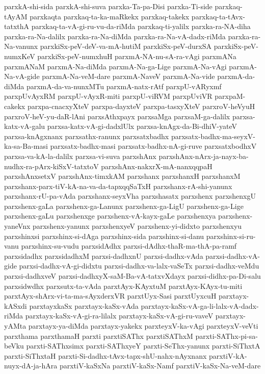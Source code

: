 {parxkA-shi-sida
parxkA-shi-suva
parxka-Ta-pa-Disi
parxka-Ti-side
parxkaq-tAyAM
parxkaqta
parxkaq-ta-ka-maRkekx
parxkaq-takekx
parxkaq-ta-tAvx-tatxthA
parxkaq-ta-vA-gi-ru-vu-da-riMda
parxkaq-ti-yalilx
parxka-ra-NA-diha
parxka-ra-Na-dalilx
parxka-ra-Na-diMda
parxka-ra-Na-vA-dadx-riMda
parxka-ra-Na-vanunx
parxkiSx-peV-deV-va-mA-hutiM
parxkiSx-peV-durxSA
parxkiSx-peV-numxKeV
parxkiSx-peV-numxhuH
parxmA-NA-nu-sA-ra-vAgi
parxmANa
parxmANaM
parxmA-Na-diMda
parxmA-Na-ga-Lige
parxmA-Na-vAgi
parxmA-Na-vA-gide
parxmA-Na-veM-dare
parxmA-NaveV
parxmA-Na-vide
parxmA-da-diMda
parxmA-da-va-nunxMTu
parxmA-natx-rAtf
parxpU-vARyxmf
parxpUvAyxRM
parxpU-vAyxR-miti
parxpU-viRVM
parxpUviVR
parxpaM-cakekx
parxpa-cnacxyXteV
parxpa-dayxteV
parxpa-tasxyXteV
parxroV-heVyuH
parxroV-heV-yu-daR-lAni
parxsAthxpayx
parxsaMga
parxsaM-ga-dalilx
parxsa-katx-vA-galu
parxsa-katx-vA-gi-dadxlUlx
parxsa-knAgx-da-Bi-dhiV-yateV
parxsa-knAgxnanx
parxsathx-ranunx
parxsatxbadhx
parxsatx-badhx-ma-seyxV-ka-sa-Ba-masi
parxsatx-badhx-masi
parxsatx-badhx-nA-gi-ruve
parxsatxbodhxV
parxsa-va-kA-la-dalilx
parxsa-vi-suva
parxshAnx
parxshAnx-nArx-ja-nayx-ba-nudhx-ra-pArx-kiSxV-tatxtoV
parxshAnx-nakxrX-mA-nanxqqpaH
parxshAnxsetxV
parxshAnx-timxkAM
parxshanx
parxshanxH
parxshanxM
parxshanx-parx-tiV-kA-na-va-da-tapxqqSaTxH
parxshanx-rA-shi-yanunx
parxshanx-rU-pa-vAda
parxshanx-seyxVha
parxshasatx
parxshenx
parxshenxgU
parxshenx-gaLa
parxshenx-ga-Lanunx
parxshenx-ga-LigU
parxshenx-ga-Lige
parxshenx-gaLu
parxshenxge
parxshenx-vA-kayx-gaLe
parxshenxya
parxshenx-yaneVnx
parxshenx-yanunx
parxshenxyeV
parxshenx-yi-didxto
parxshenxyu
parxshinxsi
parxshinx-si-dAga
parxshinx-sida
parxshinx-si-danu
parxshinx-si-ru-vanu
parxshinx-su-vudu
parxsidAdhx
parxsi-dAdhx-thaR-ma-thA-pa-ramf
parxsidadhx
parxsidadhxM
parxsi-dadhxnU
parxsi-dadhx-vAda
parxsi-dadhx-vA-gide
parxsi-dadhx-vA-gi-didxtu
parxsi-dadhx-va-lalx-vaSeTx
parxsi-dadhx-veMdu
parxsi-dadhxveV
parxsi-dadhxyX-saM-Ba-vA-tatxvXdayx
parxsi-didhx-pa-Di-salu
parxsidwdhx
parxsutx-ta-vAda
parxtAyx-KAyxtuM
parxtAyx-KAyx-tu-miti
parxtAyx-shArx-vi-ta-ma-sAyxderxVR
parxtUyx-Sasi
parxtUyxcuH
parxtayx-kASxdi
parxtayxkaSx
parxtayx-kaSx-vAda
parxtayx-kaSx-vA-ga-li-lalx-vA-dadx-riMda
parxtayx-kaSx-vA-gi-ra-lilalx
parxtayx-kaSx-vA-gi-ru-vaveV
parxtayx-yAMta
parxtayx-ya-diMda
parxtayx-yakekx
parxteyxV-ka-vAgi
parxteyxV-veVti
parxthama
parxthamaH
parxti
parxtiSAThx
parxtiSAThxM
parxti-SAThx-pi-sa-beVku
parxti-SAThxsimx
parxti-SAThxyeY
parxti-SeThx-yanunx
parxti-SiThxtA
parxti-SiThxtaH
parxti-Si-dadhx-tAvx-tapx-shU-nahx-nAyxnanx
parxtiV-kA-nuyx-dA-ja-hAra
parxtiV-kaSxNa
parxtiV-kaSx-Namf
parxtiV-kaSx-Na-veM-dare
}
